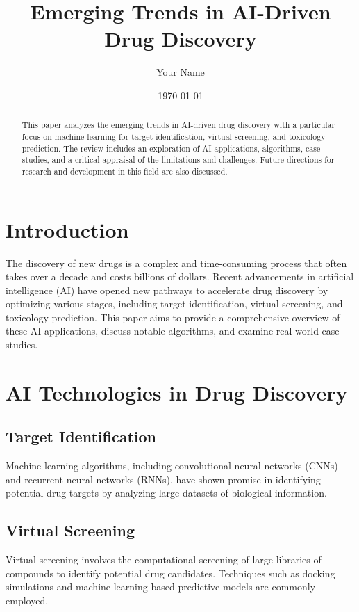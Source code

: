 \documentclass[12pt]{article}
\title{Emerging Trends in AI-Driven Drug Discovery}
\author{Your Name}
\date{\today}
\begin{document}
\maketitle

\begin{abstract}
This paper analyzes the emerging trends in AI-driven drug discovery with a particular focus on machine learning for target identification, virtual screening, and toxicology prediction. The review includes an exploration of AI applications, algorithms, case studies, and a critical appraisal of the limitations and challenges. Future directions for research and development in this field are also discussed.
\end{abstract}

\section{Introduction}
The discovery of new drugs is a complex and time-consuming process that often takes over a decade and costs billions of dollars. Recent advancements in artificial intelligence (AI) have opened new pathways to accelerate drug discovery by optimizing various stages, including target identification, virtual screening, and toxicology prediction. This paper aims to provide a comprehensive overview of these AI applications, discuss notable algorithms, and examine real-world case studies.

\section{AI Technologies in Drug Discovery}
\subsection{Target Identification}
Machine learning algorithms, including convolutional neural networks (CNNs) and recurrent neural networks (RNNs), have shown promise in identifying potential drug targets by analyzing large datasets of biological information.

\subsection{Virtual Screening}
Virtual screening involves the computational screening of large libraries of compounds to identify potential drug candidates. Techniques such as docking simulations and machine learning-based predictive models are commonly employed.
\end{document}
